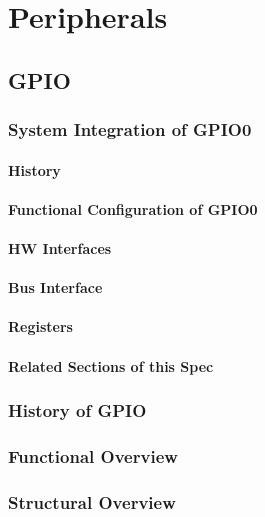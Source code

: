 \chapter{Peripherals}
\section{GPIO} %
\label{sec:gpiofunc01}
\subsection{System Integration of GPIO0}
\subsubsection{History}


\subsubsection{Functional Configuration of GPIO0}


\subsubsection{HW Interfaces}


\subsubsection{Bus Interface}

\subsubsection{Registers}

\subsubsection{Related Sections of this Spec}

\subsection{History of GPIO}

\subsection{Functional Overview}
\label{subsec:gpiofunc01}

\subsection{Structural Overview}



